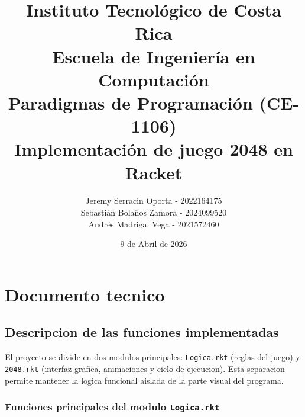 \documentclass[12pt,a4paper]{article}
\title{
    \textbf{Instituto Tecnológico de Costa Rica} \\
    \large Escuela de Ingeniería en Computación \\
    \large Paradigmas de Programación (CE-1106) \\
    \vspace{0.5cm}
    \Large \textbf{Implementación de juego 2048 en Racket}
}
\author{Jeremy Serracin Oporta - 2022164175
\\ Sebastián Bolaños Zamora - 2024099520
\\ Andrés Madrigal Vega - 2021572460}
\date{9 de Abril de 2026}
\begin{document}
\maketitle
\thispagestyle{empty}

\tableofcontents
\newpage

\section{Documento tecnico}

\subsection{Descripcion de las funciones implementadas}

El proyecto se divide en dos modulos principales: \texttt{Logica.rkt} (reglas del juego) y \texttt{2048.rkt}
(interfaz grafica, animaciones y ciclo de ejecucion). Esta separacion permite mantener la logica funcional
aislada de la parte visual del programa.

\subsubsection*{Funciones principales del modulo \texttt{Logica.rkt}}
\end{document}
